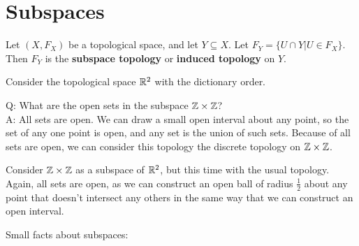 

\section{Subspaces} 
\begin{definition}
	Let $(X, F_X)$ be a topological space, and let $Y\subseteq X$. Let $F_Y = \{U \cap Y | U\in F_X\}$. Then $F_Y$ is the {\bf subspace topology} or {\bf induced topology} on $Y$. 
\end{definition}
\begin{example}
	Consider the topological space $\mathbb R^2$ with the dictionary order. 
\end{example}

Q: What are the open sets in the subspace $\mathbb Z \times \mathbb Z$?\\
A: All sets are open. We can draw a small open interval about any point, so the set of any one point is open, and any set is the union of such sets. Because of all sets are open, we can consider this topology the discrete topology on $\mathbb Z \times \mathbb Z$.
\begin{example}
	Consider $\mathbb Z \times \mathbb Z$ as a subspace of $\mathbb R^2$, but this time with the usual topology. Again, all sets are open, as we can construct an open ball of radius $\frac12$ about any point that doesn't intersect any others in the same way that we can construct an open interval. 
\end{example}

Small facts about subspaces:

